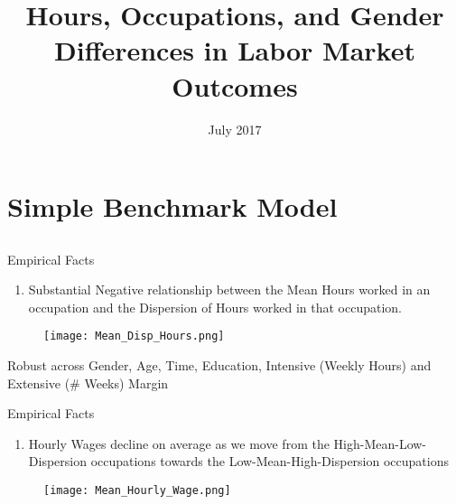\documentclass[hyperref={bookmarks=false}]{beamer}
\title{Hours, Occupations, and Gender Differences in Labor Market Outcomes}
\author[Short Name (U ABC)]{%
  \texorpdfstring{%
    \begin{columns}
      \column{.2\linewidth}
      \centering
     A. Erosa \\
      \column{.2\linewidth}
      \centering
      L. Fuister \\
      \column{.2\linewidth}
      \centering
      G. Kambourov \\
      \column{.2\linewidth}
      \centering
      R. Rogerson \\
    \end{columns}
 }
{Author 1}
}
\date{July 2017}
\newcounter{ResumeEnumerate}
\begin{document}
\begin{frame}
  \titlepage
\end{frame}


\section{Simple Benchmark Model}
\subsection{}

\begin{frame}
\end{frame}

\begin{frame}{Empirical Facts}
\begin{enumerate}
\item Substantial Negative relationship between the Mean Hours worked
in an occupation and the Dispersion of Hours worked in that occupation.
\end{enumerate}
\begin{figure}[!t]
\centering
\begin{minipage}[b]{0.9\textwidth}{}
\centering
\texttt{[image: Mean\_Disp\_Hours.png]}
\end{minipage}
\end{figure}
Robust across Gender, Age, Time, Education, Intensive (Weekly Hours) and Extensive ($\#$ Weeks) Margin
\setcounter{ResumeEnumerate}{\value{enumi}}
\end{frame}

\begin{frame}{Empirical Facts}
\begin{enumerate}[start=\numexpr\value{ResumeEnumerate}+1]
\item Hourly Wages decline on average as we move from the High-Mean-Low-Dispersion occupations towards the Low-Mean-High-Dispersion occupations
\end{enumerate}
\begin{figure}[!t]
\centering
\begin{minipage}[b]{0.9\textwidth}{}
\centering
\texttt{[image: Mean\_Hourly\_Wage.png]}
\end{minipage}
\end{figure}
\end{frame}
\end{document}
